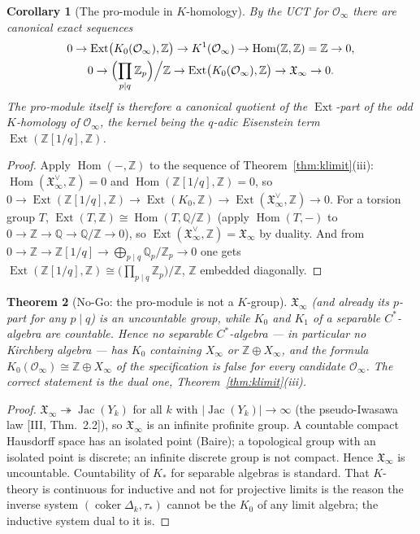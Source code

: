 \documentclass[11pt]{amsart}
\numberwithin{equation}{section}
\newtheorem{theorem}{Theorem}[section]
\newtheorem{corollary}[theorem]{Corollary}
\theoremstyle{definition}
\theoremstyle{remark}
\newcommand{\Z}{\mathbb{Z}}
\newcommand{\Q}{\mathbb{Q}}
\newcommand{\Zp}{\Z_p}
\newcommand{\Qp}{\Q_p}
\newcommand{\cO}{\mathcal{O}}
\newcommand{\XX}{\mathfrak{X}_\infty}
\newcommand{\Jac}{\operatorname{Jac}}
\newcommand{\coker}{\operatorname{coker}}
\newcommand{\Hom}{\operatorname{Hom}}
\newcommand{\Ext}{\operatorname{Ext}}
\newcommand{\ta}{\tau_*}
\begin{document}
\begin{corollary}[The pro-module in $K$-homology]\label{cor:khom}
By the UCT \cite{RS} for $\cO_\infty$ there are canonical exact sequences
\begin{gather*}
0\to\Ext\bigl(K_0(\cO_\infty),\Z\bigr)\to K^1(\cO_\infty)\to\Hom(\Z,\Z)=\Z\to0,\\
0\to\Bigl(\prod_{p\mid q}\Zp\Bigr)\Big/\Z\to\Ext\bigl(K_0(\cO_\infty),\Z\bigr)\to\XX\to0 .
\end{gather*}
The pro-module itself is therefore a canonical quotient of the $\Ext$-part of the odd
$K$-homology of $\cO_\infty$, the kernel being the $q$-adic Eisenstein term
$\Ext(\Z[1/q],\Z)$.
\end{corollary}

\begin{proof}
Apply $\Hom(-,\Z)$ to the sequence of Theorem~\ref{thm:klimit}(iii): $\Hom(\XX^{\vee},\Z)=0$
and $\Hom(\Z[1/q],\Z)=0$, so $0\to\Ext(\Z[1/q],\Z)\to\Ext(K_0,\Z)\to\Ext(\XX^{\vee},\Z)\to0$.
For a torsion group $T$, $\Ext(T,\Z)\cong\Hom(T,\Q/\Z)$ (apply $\Hom(T,-)$ to
$0\to\Z\to\Q\to\Q/\Z\to0$), so $\Ext(\XX^{\vee},\Z)=\XX$ by duality. And from
$0\to\Z\to\Z[1/q]\to\bigoplus_{p\mid q}\Qp/\Zp\to0$ one gets
$\Ext(\Z[1/q],\Z)\cong\bigl(\prod_{p\mid q}\Zp\bigr)/\Z$, $\Z$ embedded diagonally.
\end{proof}

\begin{theorem}[No-Go: the pro-module is not a $K$-group]\label{thm:nogo}
$\XX$ (and already its $p$-part for any $p\mid q$) is an uncountable group, while $K_0$
and $K_1$ of a separable $C^*$-algebra are countable. Hence no separable $C^*$-algebra
--- in particular no Kirchberg algebra --- has $K_0$ containing $X_\infty$ or
$\Z\oplus X_\infty$, and the formula $K_0(\cO_\infty)\cong\Z\oplus X_\infty$ of the
specification is false for every candidate $\cO_\infty$. The correct statement is the
dual one, Theorem~\ref{thm:klimit}(iii).
\end{theorem}

\begin{proof}
$\XX\twoheadrightarrow\Jac(Y_k)$ for all $k$ with $|\Jac(Y_k)|\to\infty$ (the
pseudo-Iwasawa law [III, Thm.~2.2]), so $\XX$ is an infinite profinite group. A
countable compact Hausdorff space has an isolated point (Baire); a topological group
with an isolated point is discrete; an infinite discrete group is not compact. Hence
$\XX$ is uncountable. Countability of $K_*$ for separable algebras is standard. That
$K$-theory is continuous for inductive and not for projective limits is the reason the
inverse system $(\coker\Delta_k,\ta)$ cannot be the $K_0$ of any limit algebra; the
inductive system dual to it is.
\end{proof}
\end{document}
